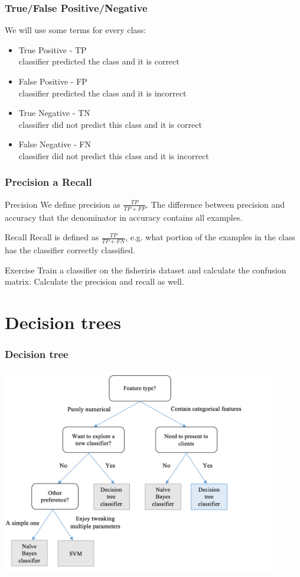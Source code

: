 \documentclass{beamer}
\begin{document}
\begin{frame}
\frametitle{True/False Positive/Negative}
We will use some terms for every class:
\begin{itemize}
\item True Positive - TP\\ classifier predicted the class and it is correct
\item False Positive - FP\\ classifier predicted the class and it is incorrect
\item True Negative - TN\\  classifier did not predict this class and it is correct
\item False Negative - FN \\  classifier did not predict this class and it is incorrect
\end{itemize}
\end{frame}

\begin{frame}
\frametitle{Precision a Recall}

\begin{block}{Precision}
We define precision as $\frac{TP}{TP + FP}$. The difference between precision and accuracy that the denominator in accuracy contains all examples.
\end{block}

\begin{block}{Recall}
Recall is defined as $\frac{TP}{TP + FN}$, e.g. what portion of the examples in the class has the classifier correctly classified.
\end{block}

\begin{block}{Exercise}
Train a classifier on the fisheriris dataset and calculate the confusion matrix. Calculate the precision and recall as well.
\end{block}

\end{frame}


\section{Decision trees}

\begin{frame}
\frametitle{Decision tree}
\includegraphics[width=0.9\textwidth]{metatree.png}
\end{frame}
\end{document}
